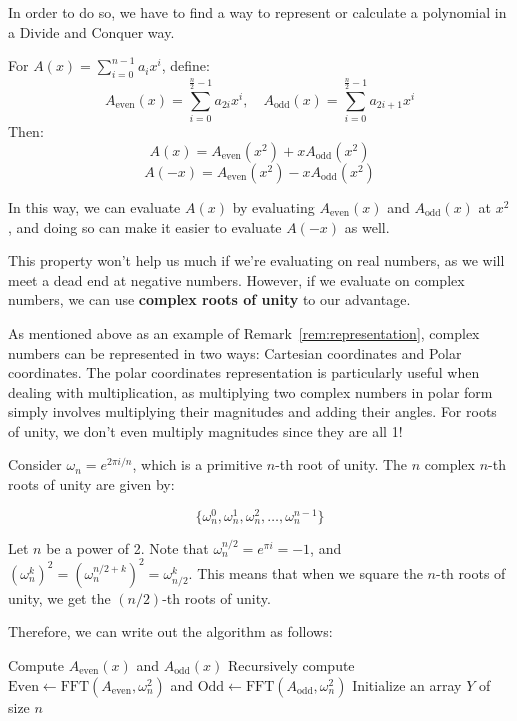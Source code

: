 In order to do so, we have to find a way to represent or calculate a polynomial in a Divide and Conquer way.

\begin{lemma}
	For $A(x) = \sum_{i=0}^{n-1} a_i x^i$, define:
	\[ A_{\text{even}}(x) = \sum_{i=0}^{\frac{n}{2}-1} a_{2i} x^i, \quad A_{\text{odd}}(x) = \sum_{i=0}^{\frac{n}{2}-1} a_{2i+1} x^i \]
	Then:
	\[A(x) = A_{\text{even}}(x^2) + x A_{\text{odd}}(x^2)\]
	\[ A(-x) = A_{\text{even}}(x^2) - x A_{\text{odd}}(x^2) \]
\end{lemma}

In this way, we can evaluate \( A(x) \) by evaluating \( A_{\text{even}}(x) \) and \( A_{\text{odd}}(x) \) at \( x^2 \), and doing so can make it easier to evaluate $A(-x)$ as well.

This property won't help us much if we're evaluating on real numbers, as we will meet a dead end at negative numbers. However, if we evaluate on complex numbers, we can use \textbf{complex roots of unity} to our advantage.

As mentioned above as an example of Remark~\ref{rem:representation}, complex numbers can be represented in two ways: Cartesian coordinates and Polar coordinates. The polar coordinates representation is particularly useful when dealing with multiplication, as multiplying two complex numbers in polar form simply involves multiplying their magnitudes and adding their angles. For roots of unity, we don't even multiply magnitudes since they are all 1!

Consider $\omega_n = e^{2\pi i / n}$, which is a primitive $n$-th root of unity. The $n$ complex $n$-th roots of unity are given by:

\[
	\{ \omega_n^0, \omega_n^1, \omega_n^2, \ldots, \omega_n^{n-1} \}
\]

Let $n$ be a power of 2. Note that $\omega_n^{n/2} = e^{\pi i} = -1$, and $(\omega_n^k)^2 = (\omega_n^{n/2+k})^2 = \omega_{n/2}^k$. This means that when we square the $n$-th roots of unity, we get the $(n/2)$-th roots of unity.

Therefore, we can write out the algorithm as follows:

\begin{algorithm}[H]
	Compute \( A_{\text{even}}(x) \) and \( A_{\text{odd}}(x) \)\;
	Recursively compute $\text{Even} \gets \text{FFT}(A_{\text{even}}, \omega_n^2)$ and $\text{Odd} \gets \text{FFT}(A_{\text{odd}}, \omega_n^2)$\;
	Initialize an array \( Y \) of size \( n \)\;
	\;
	\caption{Fast Fourier Transform (FFT)}
\end{algorithm}

